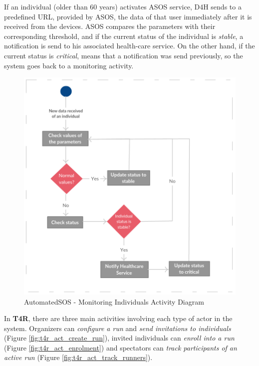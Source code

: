 \documentclass[a4paper, hidelinks, 12pt]{report}
\begin{document}
		If an individual (older than 60 years) activates ASOS service, D4H sends to a predefined URL, provided by ASOS, the data of that user immediately after it is received from the devices. ASOS compares the parameters with their corresponding threshold, and if the current status of the individual is \textit{stable}, a notification is send to his associated health-care service. On the other hand, if the current status is \textit{critical}, means that a notification was send previously, so the system goes back to a monitoring activity. \\
		
	\begin{figure}[H]
		\centering
		\includegraphics[scale=0.6]{Diagrams/asos_activity_diagram.png}
		\caption[AutomatedSOS - Monitoring Individuals Activity Diagram]{AutomatedSOS - Monitoring Individuals Activity Diagram}
		\label{fig:asos_act_monitoring}
	\end{figure}
	
	In \textbf{T4R}, there are three main activities involving each type of actor in the system. Organizers can \textit{configure a run} and \textit{send invitations to individuals} (Figure \ref{fig:t4r_act_create_run}), invited individuals can \textit{enroll into a run} (Figure \ref{fig:t4r_act_enrolment}) and spectators can \textit{track participants of an active run} (Figure \ref{fig:t4r_act_track_runners}).
	
\end{document}
